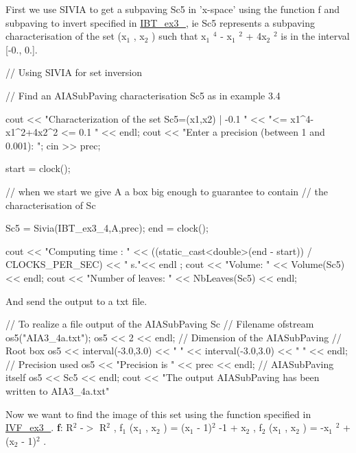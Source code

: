 \-First we use \-S\-I\-V\-I\-A to get a subpaving \-Sc5 in 'x-\/space' using the function f and subpaving to invert specified in \hyperlink{AIASubPavings_IBT_ex3_4}{\-I\-B\-T\-\_\-ex3\-\_}, ie \-Sc5 represents a subpaving characterisation of the set (x$_{\mbox{1}}$ , x$_{\mbox{2}}$ ) such that x$_{\mbox{1}}$ $^{\mbox{4}}$  -\/ x$_{\mbox{1}}$ $^{\mbox{2}}$  + 4x$_{\mbox{2}}$ $^{\mbox{2}}$  is in the interval \mbox{[}-\/0., 0.\mbox{]}.


\begin{DoxyCodeInclude}
  // Using SIVIA for set inversion

  // Find an AIASubPaving characterisation Sc5 as in example 3.4

  cout << "Characterization of the set Sc5={(x1,x2) | -0.1 " 
       << "<= x1^4-x1^2+4x2^2 <= 0.1 }" << endl;
  cout << "Enter a precision (between 1 and 0.001): ";
  cin >> prec;

  start = clock();

  // when we start we give A a box big enough to guarantee to contain 
  // the characterisation of Sc

  Sc5 = Sivia(IBT_ex3_4,A,prec);
  end = clock();

  cout << "Computing time : " 
       << ((static_cast<double>(end - start)) / CLOCKS_PER_SEC) << " s."<< endl
      ;
  cout << "Volume: " << Volume(Sc5) << endl;
  cout << "Number of leaves: " << NbLeaves(Sc5) << endl;

\end{DoxyCodeInclude}


\-And send the output to a txt file.


\begin{DoxyCodeInclude}
  // To realize a file output of the AIASubPaving Sc
                    // Filename
  ofstream os5("AIA3_4a.txt");
  os5 << 2 << endl; // Dimension of the AIASubPaving
                    // Root box
  os5 << interval(-3.0,3.0) << " "
    << interval(-3.0,3.0) << " " << endl;
                    // Precision used
  os5 << "Precision is " << prec << endl;
                    // AIASubPaving itself
  os5 << Sc5 << endl;
  cout << "The output AIASubPaving has been written to AIA3_4a.txt" 

\end{DoxyCodeInclude}


\-Now we want to find the image of this set using the function specified in \hyperlink{AIASubPavings_IVF_ex3_4}{\-I\-V\-F\-\_\-ex3\-\_}. {\bfseries f}\-: \-R$^{\mbox{2}}$  -\/$>$ \-R$^{\mbox{2}}$ , f$_{\mbox{1}}$ (x$_{\mbox{1}}$ , x$_{\mbox{2}}$ ) = (x$_{\mbox{1}}$  -\/ 1)$^{\mbox{2}}$  -\/1 + x$_{\mbox{2}}$ , f$_{\mbox{2}}$ (x$_{\mbox{1}}$ , x$_{\mbox{2}}$ ) = -\/x$_{\mbox{1}}$ $^{\mbox{2}}$  + (x$_{\mbox{2}}$  -\/ 1)$^{\mbox{2}}$ .


